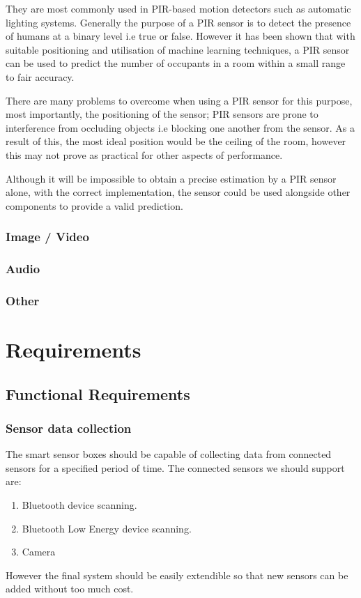 \documentclass{l4proj}
\begin{document}
They are most commonly used in PIR-based motion detectors such as automatic lighting systems. Generally the purpose of a PIR sensor is to detect the presence of humans at a binary level i.e true or false. However it has been shown that with suitable positioning and utilisation of machine learning techniques, a PIR sensor can be used to predict the number of occupants in a room within a small range to fair accuracy.

There are many problems to overcome when using a PIR sensor for this purpose, most importantly, the positioning of the sensor; PIR sensors are prone to interference from occluding objects i.e blocking one another from the sensor. As a result of this, the most ideal position would be the ceiling of the room, however this may not prove as practical for other aspects of performance.

Although it will be impossible to obtain a precise estimation by a PIR sensor alone, with the correct implementation, the sensor could be used alongside other components to provide a valid prediction.

\subsection{Image / Video}

\subsection{Audio}

\subsection{Other}


\chapter{Requirements}

\section{Functional Requirements}

\subsection{Sensor data collection}
The smart sensor boxes should be capable of collecting data from connected sensors for a specified period of time. The connected sensors we should support are:
\begin{enumerate}
  \item Bluetooth device scanning.
  \item Bluetooth Low Energy device scanning.
  \item Camera
\end{enumerate}
However the final system should be easily extendible so that new sensors can be added without too much cost.
\end{document}
